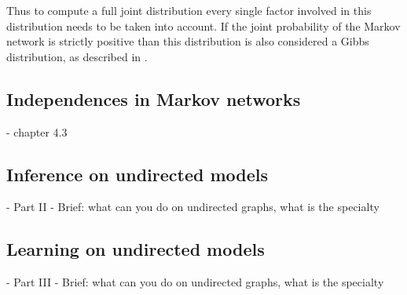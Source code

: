 Thus to compute a full joint distribution every single factor involved in this distribution needs to be taken into account. If the joint probability of the Markov network is strictly positive than this distribution is also considered a Gibbs distribution, as described in \cite{kindermann1980markov}.

\subsection{Independences in Markov networks}

- chapter 4.3

\subsection{Inference on undirected models}

- Part II
- Brief: what can you do on undirected graphs, what is the specialty

\subsection{Learning on undirected models}

- Part III
- Brief: what can you do on undirected graphs, what is the specialty
